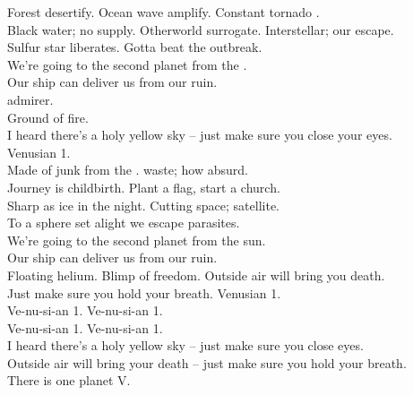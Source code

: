 Forest desertify. Ocean wave amplify. Constant tornado . \\
Black water; no supply. Otherworld surrogate. Interstellar; our escape. \\
Sulfur star liberates. Gotta beat the outbreak. \\

We're going to the second planet from the . \\
Our ship can deliver us from our ruin. \\

 admirer. \\
Ground of fire. \\
I heard there's a holy yellow sky -- just make sure you close your eyes. \\
Venusian 1. \\

Made of junk from the .  waste; how absurd. \\
Journey is childbirth. Plant a flag, start a church. \\
Sharp as ice in the night. Cutting space; satellite. \\
To a sphere set alight we escape parasites. \\

We're going to the second planet from the sun. \\
Our ship can deliver us from our ruin. \\

Floating helium. Blimp of freedom. Outside air will bring you death. \\
Just make sure you hold your breath. Venusian 1. \\

Ve-nu-si-an 1. Ve-nu-si-an 1. \\
Ve-nu-si-an 1. Ve-nu-si-an 1. \\

I heard there's a holy yellow sky -- just make sure you close eyes. \\
Outside air will bring your death -- just make sure you hold your breath. \\

There is one planet V. \\




